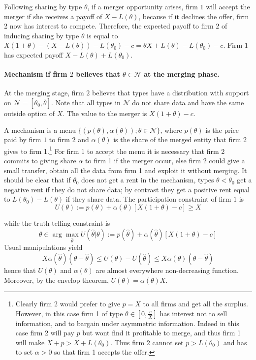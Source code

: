 \documentclass[a4paper]{article}
\newcommand{\N}{\mathcal N}
\renewcommand{\th}{\hat\theta}
\renewcommand{\t}{\theta}
\renewcommand{\a}{\alpha}
\begin{document}
Following sharing by type $\t$, if a merger opportunity arises, firm $1$ will accept the merger if she receives a payoff of $X-L(\t)$, because if it declines the offer, firm 2 now has interest to compete. Therefore, the expected payoff to firm $2$ of inducing sharing by type $\t$ is equal to $X(1+\t)-(X-L(\t))-L(\t_0)-c=\t X +L(\t)-L(\t_0)-c$. Firm $1$ has expected payoff $X-L(\t)+L(\t_0)$.


\paragraph{Mechanism if firm $2$ believes that $\t\in\N$ at the merging phase.} At the merging stage, firm $2$ believes that types have a distribution with support on $\N=[\t_0,\overline \t]$. Note that all types in $\N$ do not share data and have the same outside option of $X$. The value to the merger is $X(1+\t)-c$. 

A mechanism is a menu $\{(p(\t),\a(\t));\t\in \N\}$, where $p(\t)$ is the price paid by firm $1$ to firm $2$ and $\a(\t)$ is the share of the merged entity that firm $2$ gives to firm 1.\footnote{Clearly firm 2 would prefer to give $p=X$ to all firms and get all the surplus. However, in this case firm 1 of type $\t\in[0,\frac{c}{X}]$ has interest not to sell information, and to bargain under asymmetric information. Indeed in this case firm 2 will pay $p$ but wont find it profitable to merge, and thus firm 1 will make $X+p>X+L(\t_0)$. Thus firm 2 cannot set $p>L(\t_0)$ and has to set $\a >0$ so that firm 1 accepts the offer.} For firm 1 to accept the menu it is necessary that firm 2 commits to giving share $\a$ to firm 1 if the merger occur, else firm 2 could give a small transfer, obtain all the data from firm 1 and exploit it without merging. It should be clear that if $\t_0$ does not get a rent in the mechanism, types $\t<\t_0$ get a negative rent if they do not share data; by contrast they get a positive rent equal to $L(\t_0)-L(\t)$ if they share data. The participation constraint of firm $1$ is
\begin{equation}
  U(\t):=p(\t)+\a(\t)[X(1+\t)-c]\geq X 
\end{equation}

while the truth-telling constraint is
\begin{equation*}
  \t \in \arg\max_{\th} U(\th|\t):=p(\th)+\a(\hat \t)[X(1+\t)-c]
\end{equation*}
%
Usual manipulations yield 
%
\[
  X \a(\th)(\t-\th)\leq U(\t)-U(\th)\leq X\a(\t)(\t-\th)
\]
%
hence that $U(\t)$ and $\a(\t)$ are almost everywhere non-decreasing function. Moreover, by the envelop theorem, $\dot U(\theta)=\a(\t)X$. 
\end{document}
